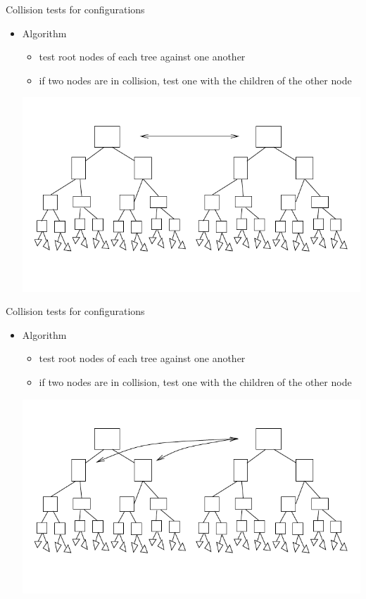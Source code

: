 %
%

\begin{frame} {Collision tests for configurations}
  \begin{itemize}
  \item Algorithm
    \begin{itemize}
    \item test root nodes of each tree against one another
    \item if two nodes are in collision, test one with the children of the other node
    \end{itemize}
    \centerline {
      \includegraphics[width=.8\linewidth]{figures/collision-test1.pdf}
    }
  \end{itemize}

\end{frame}

\begin{frame} {Collision tests for configurations}
  \begin{itemize}
  \item Algorithm
    \begin{itemize}
    \item test root nodes of each tree against one another
    \item if two nodes are in collision, test one with the children of the other node
    \end{itemize}
    \centerline {
      \includegraphics[width=.8\linewidth]{figures/collision-test2.pdf}
    }
  \end{itemize}

\end{frame}

